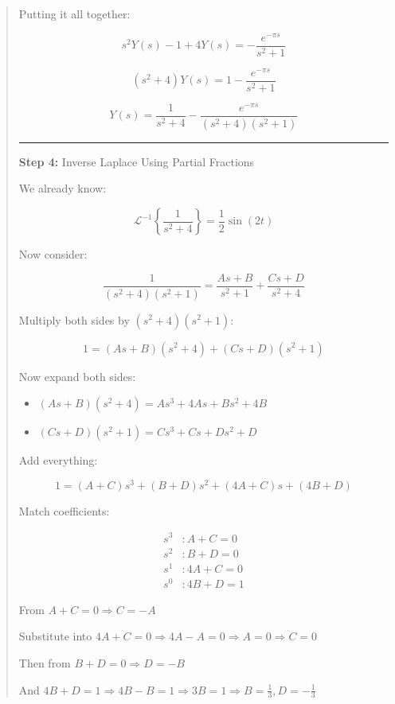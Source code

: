 \documentclass[
  letterpaper,
  DIV=11,
  numbers=noendperiod]{scrreprt}
\providecommand{\tightlist}{%
  \setlength{\itemsep}{0pt}\setlength{\parskip}{0pt}}
\theoremstyle{plain}
\theoremstyle{remark}
\begin{document}
\begin{tcolorbox}
\begin{quote}
Putting it all together:

\[
s^2 Y(s) - 1 + 4Y(s) = -\frac{e^{-\pi s}}{s^2 + 1}
\]

\[
(s^2 + 4)Y(s) = 1 - \frac{e^{-\pi s}}{s^2 + 1}
\]

\[
Y(s) = \frac{1}{s^2 + 4} - \frac{e^{-\pi s}}{(s^2 + 4)(s^2 + 1)}
\]

\begin{center}\rule{0.5\linewidth}{0.5pt}\end{center}

\textbf{Step 4:} Inverse Laplace Using Partial Fractions

We already know:

\[
\mathcal{L}^{-1}\left\{\frac{1}{s^2 + 4}\right\} = \frac{1}{2} \sin(2t)
\]

Now consider:

\[
\frac{1}{(s^2 + 4)(s^2 + 1)} = \frac{As + B}{s^2 + 1} + \frac{Cs + D}{s^2 + 4}
\]

Multiply both sides by \((s^2 + 4)(s^2 + 1)\):

\[
1 = (As + B)(s^2 + 4) + (Cs + D)(s^2 + 1)
\]

Now expand both sides:

\begin{itemize}
\tightlist
\item
  \((As + B)(s^2 + 4) = As^3 + 4As + Bs^2 + 4B\)
\item
  \((Cs + D)(s^2 + 1) = Cs^3 + Cs + Ds^2 + D\)
\end{itemize}

Add everything:

\[
1 = (A + C)s^3 + (B + D)s^2 + (4A + C)s + (4B + D)
\]

Match coefficients:

\[
\begin{aligned}
s^3 &: A + C = 0 \\
s^2 &: B + D = 0 \\
s^1 &: 4A + C = 0 \\
s^0 &: 4B + D = 1
\end{aligned}
\]

From \(A + C = 0 \Rightarrow C = -A\)

Substitute into
\(4A + C = 0 \Rightarrow 4A - A = 0 \Rightarrow A = 0 \Rightarrow C = 0\)

Then from \(B + D = 0 \Rightarrow D = -B\)

And
\(4B + D = 1 \Rightarrow 4B - B = 1 \Rightarrow 3B = 1 \Rightarrow B = \frac{1}{3}, D = -\frac{1}{3}\)


\end{quote}
\end{tcolorbox}
\end{document}
